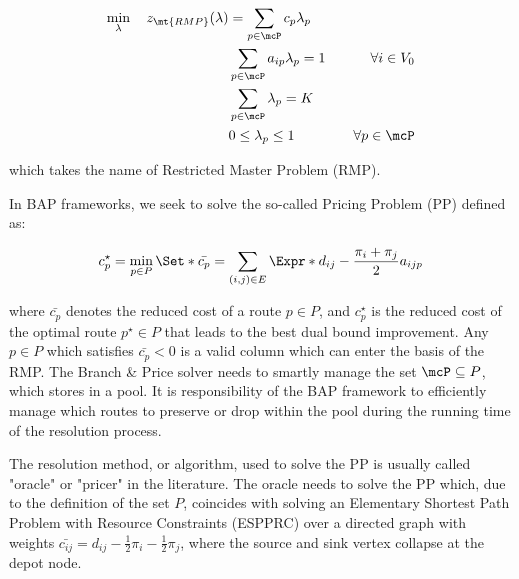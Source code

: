 \begin{align}
	\min_{\lambda} \quad z_\mt{RMP}(\lambda) & = \sum_{p \in \mcP}  c_p \lambda_p \label{eq:rmp-obj-func}                                                                                                                              \\
                                             & \sum_{p \in \mcP}  a_{ip} \lambda_p = 1                   & \quad \forall i \in V_0                                              \label{eq:rmp-customers-visited-by-exactly-one-route} \\
	                                         & \sum_{p \in \mcP} \lambda_{p} = K\label{eq:rmp-K-routes}                                                                                                                                \\
	                                         & 0 \le \lambda_p \le 1                                        & \quad \forall p \in \mcP \label{eq:rmp-lambda-mip-var-bounds}
\end{align}

which takes the name of Restricted Master Problem (RMP).

In BAP frameworks, we seek to solve the so-called Pricing Problem (PP) defined as:

\begin{equation}
	{c^\star_p} = \min_{p \in P} \Set*{ \bar{c_p} = \sum_{(i, j) \in E} \Expr*{d_{ij} - \frac{\pi_i + \pi_j}{2}} a_{ijp}  }
\end{equation}

where $\bar{c_p}$ denotes the reduced cost of a route $p \in P$, and $c^\star_p$ is the reduced cost of the optimal route $p^\star \in P$ that leads to the best dual bound improvement.
Any $p \in P$ which satisfies $\bar{c_p} < 0$ is a valid column which can enter the basis of the RMP.
The Branch \& Price solver needs to smartly manage the set $\mcP \subseteq P$, which stores in a pool.
It is responsibility of the BAP framework to efficiently manage which routes to preserve or drop within the pool during the running time of the resolution process.

The resolution method, or algorithm, used to solve the PP is usually called "oracle" or "pricer" in the literature.
The oracle needs to solve the PP which, due to the definition of the set $P$, coincides with solving an Elementary Shortest Path Problem with Resource Constraints (ESPPRC) over a directed graph with weights $\bar{c_{ij}} = d_{ij} - \frac{1}{2} \pi_i - \frac{1}{2} \pi_j$, where the source and sink vertex collapse at the depot node.

